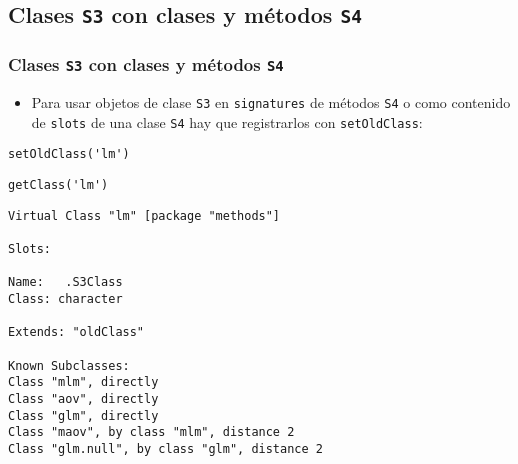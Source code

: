 \documentclass[xcolor={usenames,svgnames,dvipsnames}]{beamer}
\begin{document}
\subsection{Clases \texttt{S3} con clases y métodos \texttt{S4}}
\label{sec-3-3}
\begin{frame}[fragile]
\frametitle{Clases \texttt{S3} con clases y métodos \texttt{S4}}
\label{sec-3-3-1}

\begin{itemize}
\item Para usar objetos de clase \texttt{S3} en \texttt{signatures} de métodos \texttt{S4} o
  como contenido de \texttt{slots} de una clase \texttt{S4} hay que registrarlos con
  \texttt{setOldClass}:
\end{itemize}

\lstset{language=R}
\begin{lstlisting}
setOldClass('lm')
\end{lstlisting}



\lstset{language=R}
\begin{lstlisting}
getClass('lm')
\end{lstlisting}


\begin{verbatim}
Virtual Class "lm" [package "methods"]

Slots:
                
Name:   .S3Class
Class: character

Extends: "oldClass"

Known Subclasses: 
Class "mlm", directly
Class "aov", directly
Class "glm", directly
Class "maov", by class "mlm", distance 2
Class "glm.null", by class "glm", distance 2
\end{verbatim}
\end{frame}
\end{document}
